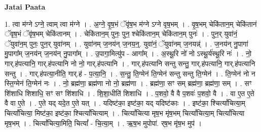 \documentclass[17pt]{extarticle}
\begin{document}
\textbf{Jatai Paata} \newline

1. त्वा म॑ग्ने ऽग्ने॒ त्वाम् त्वा म॑ग्ने । . अ॒ग्ने॒ वृ॒ष॒भं ॅवृ॑ष॒भ म॑ग्ने ऽग्ने वृष॒भम् । . वृ॒ष॒भम् चेकि॑तान॒म् चेकि॑तानं ॅवृष॒भं ॅवृ॑ष॒भम् चेकि॑तानम् । . चेकि॑तान॒म् पुनः॒ पुन॒ श्चेकि॑तान॒म् चेकि॑तान॒म् पुनः॑ । . पुन॒र् युवा॑नं॒ ॅयुवा॑न॒म् पुनः॒ पुन॒र् युवा॑नम् । . युवा॑नम् ज॒नय॑न् ज॒नय॒न्॒. युवा॑नं॒ ॅयुवा॑नम् ज॒नयन्न्॑ । . ज॒नय॑न् नु॒पागा॑ मु॒पागा᳚म् ज॒नय॑न् ज॒नय॑न् नु॒पागा᳚म् । . उ॒पागा॒मित्यु॑प - आगा᳚म् । . अ॒स्थू॒रि नो॑ नो ऽस्थू॒र्य॑स्थू॒रि नः॑ । . नो॒ गार्.ह॑पत्यानि॒ गार्.ह॑पत्यानि नो नो॒ गार्.ह॑पत्यानि । . गार्.ह॑पत्यानि सन्तु सन्तु॒ गार्.ह॑पत्यानि॒ गार्.ह॑पत्यानि सन्तु । . गार्.ह॑पत्या॒नीति॒ गार्.ह॑ - प॒त्या॒नि॒ । . स॒न्तु॒ ति॒ग्मेन॑ ति॒ग्मेन॑ सन्तु सन्तु ति॒ग्मेन॑ । . ति॒ग्मेन॑ नो न स्ति॒ग्मेन॑ ति॒ग्मेन॑ नः । . नो॒ ब्रह्म॑णा॒ ब्रह्म॑णा नो नो॒ ब्रह्म॑णा । . ब्रह्म॑णा॒ सꣳ सम् ब्रह्म॑णा॒ ब्रह्म॑णा॒ सम् । . सꣳ शि॑शाधि शिशाधि॒ सꣳ सꣳ शि॑शाधि । . शि॒शा॒धीति॑ शिशाधि । . प॒शवो॒ वै वै प॒शवः॑ प॒शवो॒ वै । . वा ए॒त ए॒ते वै वा ए॒ते । . ए॒ते यद् यदे॒त ए॒ते यत् । . यदिष्ट॑का॒ इष्ट॑का॒ यद् यदिष्ट॑काः । . इष्ट॑का॒ श्चित्यां᳚चित्या॒म् चित्यां᳚चित्या॒ मिष्ट॑का॒ इष्ट॑का॒ श्चित्यां᳚चित्याम् । . चित्यां᳚चित्या मृष॒भ मृ॑ष॒भम् चित्यां᳚चित्या॒म् चित्यां᳚चित्या मृष॒भम् । . चित्यां᳚चित्या॒मिति॒ चित्यां᳚ - चि॒त्या॒म् । . ऋ॒ष॒भ मुपोपा॑. र्‌ष॒भ मृ॑ष॒भ मुप॑ । \newline
\end{document}
